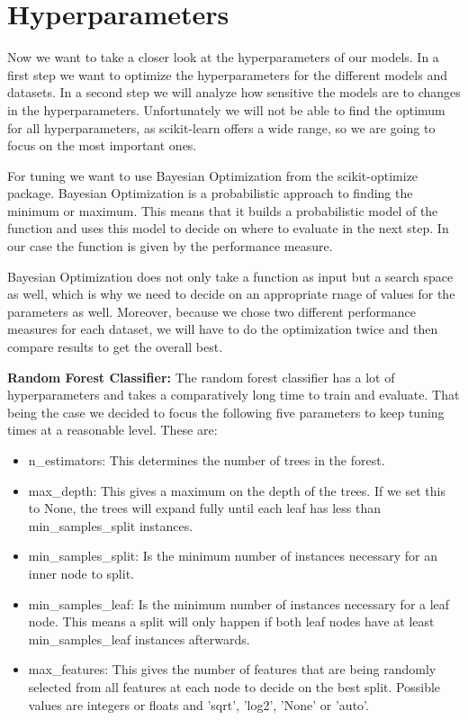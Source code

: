 \documentclass[a4paper,12pt]{article}
\begin{document}
\section{Hyperparameters}
\label{sec:hyperparameters}
Now we want to take a closer look at the hyperparameters of our models. In a first step we want to optimize the hyperparameters for the different models and datasets.
In a second step we will analyze how sensitive the models are to changes in the hyperparameters. Unfortunately we will not be able to find the optimum for all hyperparameters, as scikit-learn offers a wide range, so we are going to focus on the most important ones.

For tuning we want to use Bayesian Optimization from the scikit-optimize package. Bayesian Optimization is a probabilistic approach to finding the minimum or maximum. This means that it builds a probabilistic model of the function and uses this model to decide on where to evaluate in the next step. In our case the function is given by the performance measure. 

Bayesian Optimization does not only take a function as input but a search space as well, which is why we need to decide on an appropriate rnage of values for the parameters as well. Moreover, because we chose two different performance measures for each dataset, we will have to do the optimization twice and then compare results to get the overall best.

\textbf{Random Forest Classifier:} The random forest classifier has a lot of hyperparameters and takes a comparatively long time to train and evaluate. That being the case we decided to focus the following five parameters to keep tuning times at a reasonable level. These are:

\begin{itemize}
    \item \textsf{n\_estimators}: This determines the number of trees in the forest.
\item \textsf{max\_depth}: This gives a maximum on the depth of the trees. If we set this to None, the trees will expand fully until each leaf has less than \textsf{min\_samples\_split} instances.
\item \textsf{min\_samples\_split}: Is the minimum number of instances necessary for an inner node to split.
\item \textsf{min\_samples\_leaf}: Is the minimum number of instances necessary for a leaf node. This means a split will only happen if both leaf nodes have at least \textsf{min\_samples\_leaf} instances afterwards.
\item \textsf{max\_features}: This gives the number of features that are being randomly selected from all features at each node to decide on the best split. Possible values are integers or floats and 'sqrt', 'log2', 'None' or 'auto'.
\end{itemize}
\end{document}

